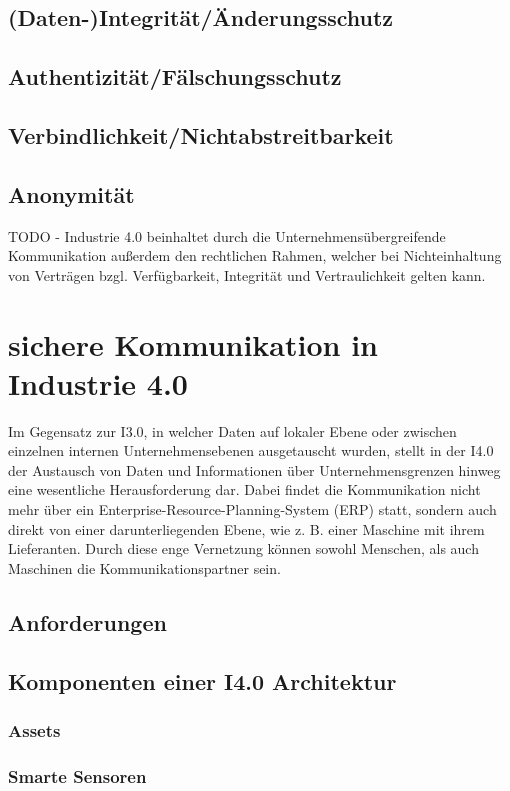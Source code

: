 \subsection{(Daten-)Integrität/Änderungsschutz}
\subsection{Authentizität/Fälschungsschutz}
\subsection{Verbindlichkeit/Nichtabstreitbarkeit}
\subsection{Anonymität}

TODO - Industrie 4.0 beinhaltet durch die Unternehmensübergreifende Kommunikation außerdem den rechtlichen Rahmen, welcher bei Nichteinhaltung von Verträgen bzgl. Verfügbarkeit, Integrität und Vertraulichkeit gelten kann.

\section{sichere Kommunikation in Industrie 4.0}
Im Gegensatz zur I3.0, in welcher Daten auf lokaler Ebene oder zwischen einzelnen internen Unternehmensebenen ausgetauscht wurden, stellt in der I4.0 der Austausch von Daten und Informationen über Unternehmensgrenzen hinweg eine wesentliche Herausforderung dar. Dabei findet die Kommunikation nicht mehr über ein Enterprise-Resource-Planning-System (ERP) statt, sondern auch direkt von einer darunterliegenden Ebene, wie z. B. einer Maschine mit ihrem Lieferanten. Durch diese enge Vernetzung können sowohl Menschen, als auch Maschinen die Kommunikationspartner sein.

\subsection{Anforderungen}
\subsection{Komponenten einer I4.0 Architektur}
\subsubsection{Assets}
\subsubsection{Smarte Sensoren}

